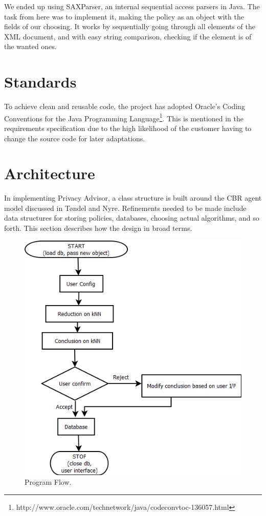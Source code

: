 We ended up using SAXParser, an internal sequential access parsers in Java. The task from here was to implement it, making the policy as an object with the fields of our choosing. It works by sequentially going through all elements of the XML document, and with easy string comparison, checking if the element is of the wanted ones.



\section{Standards}
To achieve clean and reusable code, the project has adopted Oracle's Coding Conventions for the Java Programming Language\footnote{http://www.oracle.com/technetwork/java/codeconvtoc-136057.html}. This is mentioned in the requirements specification due to the high likelihood of the customer having to change the source code for later adaptations.


\section{Architecture}
In implementing Privacy Advisor, a class structure is built around the CBR agent model discussed in T{\o}ndel and Nyre. Refinements needed to be made include data structures for storing policies, databases, choosing actual algorithms, and so forth. This section describes how the design in broad terms.

\begin{figure}[htbp]
\begin{center}
\includegraphics[width = \textwidth]{DesignReport/uml/flowchart.png}
\caption{Program Flow.}
\label{DesignFlowChrt}
\end{center}
\end{figure}

